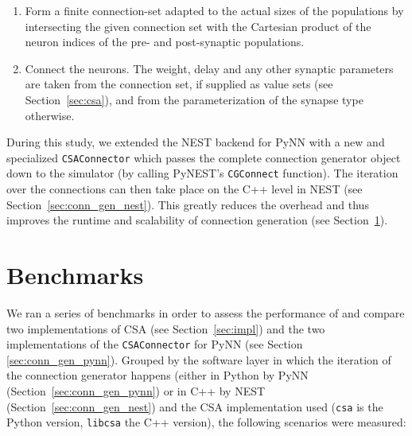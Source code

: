 \documentclass{frontiersSCNS} %
\begin{document}
\begin{enumerate}
\item Form a finite connection-set adapted to the actual sizes of the
  populations by intersecting the given connection set with the
  Cartesian product of the neuron indices of the pre- and
  post-synaptic populations.
\item Connect the neurons. The weight, delay and any other synaptic
  parameters are taken from the connection set, if supplied as value
  sets (see Section~\ref{sec:csa}), and from the parameterization of
  the synapse type otherwise.
\end{enumerate}

During this study, we extended the NEST backend for PyNN with a new
and specialized \verb|CSAConnector| which passes the complete
connection generator object down to the simulator (by calling PyNEST's
\verb|CGConnect| function). The iteration over the connections can
then take place on the C++ level in NEST (see
Section~\ref{sec:conn_gen_nest}). This greatly reduces the overhead
and thus improves the runtime and scalability of connection generation
(see Section~\ref{sec:benchmarks}).


\section{Benchmarks}\label{sec:benchmarks}

We ran a series of benchmarks in order to assess the performance of
and compare two implementations of CSA (see Section~\ref{sec:impl})
and the two implementations of the \verb|CSAConnector| for PyNN (see
Section \ref{sec:conn_gen_pynn}). Grouped by the software layer in
which the iteration of the connection generator happens (either in
Python by PyNN (Section~\ref{sec:conn_gen_pynn}) or in C++ by NEST
(Section~\ref{sec:conn_gen_nest})
and the CSA implementation used (\verb|csa| is the Python version,
\verb|libcsa| the C++ version), the following scenarios were measured:
\end{document}
